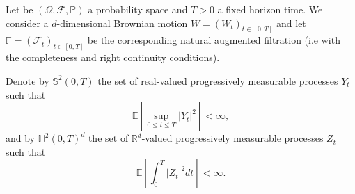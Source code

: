 Let be $(\Omega,\mathcal{F},\mathbb{P})$ a probability space and $T>0$ a fixed horizon time. We consider a $d$-dimensional Brownian motion $W=(W_t)_{t\in [0,T]}$ and let $\mathbb{F}=(\mathcal{F}_t)_{t\in[0,T]}$ be the corresponding natural augmented filtration (i.e with the completeness and right continuity conditions).

Denote by $\mathbb{S}^2(0,T)$ the set of real-valued progressively measurable processes $Y_t$ such that 
\begin{equation}
	\mathbb{E}\left[\sup_{0\leq t \leq T}|Y_t|^2\right]<\infty,
\end{equation}  
and by $\mathbb{H}^2(0,T)^d$ the set of $\mathbb{R}^d$-valued progressively measurable processes $Z_t$ such that
\begin{equation}
	\mathbb{E}\left[\int_{0}^{T}|Z_t|^2 dt\right]<\infty.
\end{equation}


